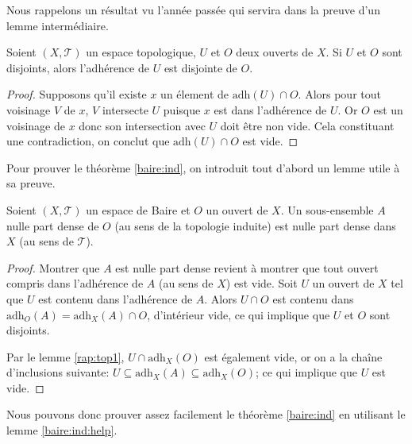 Nous rappelons un résultat vu l'année passée qui servira dans la preuve
d'un lemme intermédiaire.
\begin{lem}\label{rap:top1}
  Soient $(X, \mathcal{T})$ un espace topologique, $U$ et $O$ deux ouverts
  de $X$. Si $U$ et $O$ sont disjoints, alors l'adhérence de $U$ est
  disjointe de $O$.
\end{lem}

\begin{proof}
  Supposons qu'il existe $x$ un élement de $\mathrm{adh}(U)\cap O$.
  Alors pour tout voisinage $V$ de $x$, $V$ intersecte $U$ puisque
  $x$ est dans l'adhérence de $U$. Or $O$ est un voisinage de $x$
  donc son intersection avec $U$ doit être non vide. Cela constituant
  une contradiction, on conclut que $\mathrm{adh}(U)\cap O$ est vide.
\end{proof}


Pour prouver le théorème \ref{baire:ind},
on introduit tout d'abord un lemme utile
à sa preuve.
\begin{lem}\label{baire:ind:help}
  Soient $(X, \mathcal{T})$ un espace de Baire et $O$ un ouvert de $X$.
  Un sous-ensemble $A$ nulle part dense de $O$ (au sens de la topologie
  induite) est nulle part dense dans $X$ (au sens de $\mathcal{T}$).
\end{lem}

\begin{proof}
  Montrer que $A$ est nulle part dense revient à montrer que
  tout ouvert compris dans l'adhérence de $A$ (au sens de $X$) est vide. Soit $U$
  un ouvert de $X$ tel que $U$ est contenu dans l'adhérence
  de $A$. Alors $U\cap O$ est contenu dans $\mathrm{adh}_O(A) =
  \mathrm{adh}_X(A)\cap O$, d'intérieur vide, ce qui implique que $U$ et $O$
  sont disjoints.

  Par le lemme \ref{rap:top1}, $U\cap \mathrm{adh}_X(O)$
  est également vide, or on a la chaîne d'inclusions suivante:
  $U\subseteq \mathrm{adh}_X(A)\subseteq \mathrm{adh}_X(O)$;
  ce qui implique que $U$ est vide.
\end{proof}

Nous pouvons donc prouver assez facilement le théorème
\ref{baire:ind} en utilisant le lemme \ref{baire:ind:help}.


